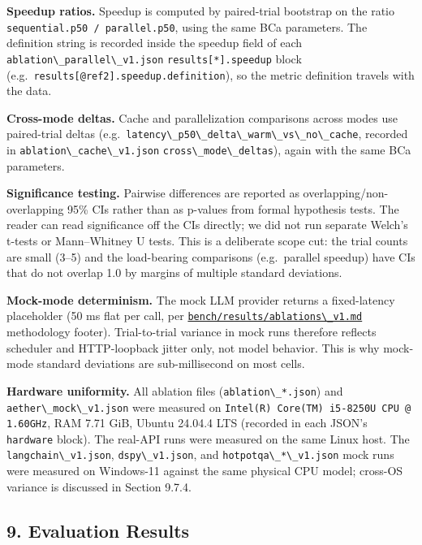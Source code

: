 \documentclass[
]{article}
\newcommand{\passthrough}[1]{#1}
\begin{document}
\textbf{Speedup ratios.} Speedup is computed by paired-trial bootstrap
on the ratio \passthrough{\lstinline!sequential.p50 / parallel.p50!},
using the same BCa parameters. The definition string is recorded inside
the speedup field of each
\passthrough{\lstinline!ablation\_parallel\_v1.json!}
\passthrough{\lstinline!results[*].speedup!} block
(e.g.~\passthrough{\lstinline!results[@ref2].speedup.definition!}), so
the metric definition travels with the data.

\textbf{Cross-mode deltas.} Cache and parallelization comparisons across
modes use paired-trial deltas
(e.g.~\passthrough{\lstinline!latency\_p50\_delta\_warm\_vs\_no\_cache!},
recorded in \passthrough{\lstinline!ablation\_cache\_v1.json!}
\passthrough{\lstinline!cross\_mode\_deltas!}), again with the same BCa
parameters.

\textbf{Significance testing.} Pairwise differences are reported as
overlapping/non-overlapping 95\% CIs rather than as p-values from formal
hypothesis tests. The reader can read significance off the CIs directly;
we did not run separate Welch's t-tests or Mann--Whitney U tests. This
is a deliberate scope cut: the trial counts are small (3--5) and the
load-bearing comparisons (e.g.~parallel speedup) have CIs that do not
overlap 1.0 by margins of multiple standard deviations.

\textbf{Mock-mode determinism.} The mock LLM provider returns a
fixed-latency placeholder (50 ms flat per call, per
\href{../bench/results/ablations_v1.md}{\passthrough{\lstinline!bench/results/ablations\_v1.md!}}
methodology footer). Trial-to-trial variance in mock runs therefore
reflects scheduler and HTTP-loopback jitter only, not model behavior.
This is why mock-mode standard deviations are sub-millisecond on most
cells.

\textbf{Hardware uniformity.} All ablation files
(\passthrough{\lstinline!ablation\_*.json!}) and
\passthrough{\lstinline!aether\_mock\_v1.json!} were measured on
\passthrough{\lstinline!Intel(R) Core(TM) i5-8250U CPU @ 1.60GHz!}, RAM
7.71 GiB, Ubuntu 24.04.4 LTS (recorded in each JSON's
\passthrough{\lstinline!hardware!} block). The real-API runs were
measured on the same Linux host. The
\passthrough{\lstinline!langchain\_v1.json!},
\passthrough{\lstinline!dspy\_v1.json!}, and
\passthrough{\lstinline!hotpotqa\_*\_v1.json!} mock runs were measured
on Windows-11 against the same physical CPU model; cross-OS variance is
discussed in Section 9.7.4.

\subsection{9. Evaluation Results}\label{evaluation-results}
\end{document}
